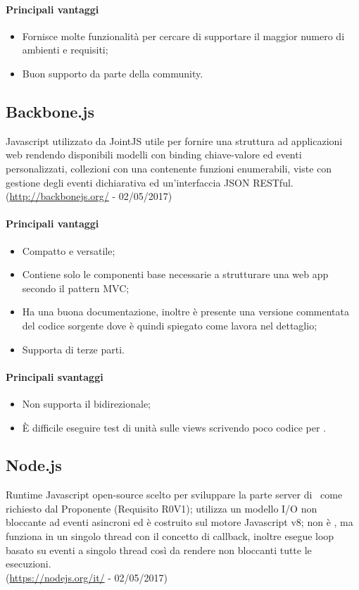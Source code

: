 \documentclass[../PianoDiQualifica.tex]{subfiles}
\begin{document}
			\paragraph{Principali vantaggi}
			\begin{itemize}
					\item Fornisce molte funzionalità per cercare di supportare il maggior numero di
					ambienti e requisiti;
					\item Buon supporto da parte della community.
				\end{itemize}
		\subsection{Backbone.js}
			 Javascript utilizzato da JointJS utile per fornire una struttura ad applicazioni
			web rendendo disponibili modelli con binding chiave-valore ed eventi personalizzati,
			collezioni con una  contenente funzioni enumerabili, viste con gestione degli eventi
			dichiarativa ed un'interfaccia JSON RESTful.\\
			(\url{http://backbonejs.org/} - 02/05/2017)
			\paragraph{Principali vantaggi}
			\begin{itemize}
					\item Compatto e versatile;
					\item Contiene solo le componenti base necessarie a strutturare una web app
					secondo il pattern MVC;
					\item Ha una buona documentazione, inoltre è presente una versione commentata
					del codice sorgente dove è quindi spiegato come lavora nel dettaglio;
					\item Supporta  di terze parti.
				\end{itemize}
			\paragraph{Principali svantaggi}
				\begin{itemize}
					\item Non supporta il  bidirezionale;
					\item È difficile eseguire test di unità sulle views scrivendo poco codice per .
				\end{itemize}
		\subsection{Node.js}
			Runtime Javascript open-source scelto per sviluppare la parte server di \progetto\,
			come richiesto dal Proponente (Requisito R0V1); utilizza un modello I/O non bloccante
			ad eventi asincroni ed è costruito sul motore Javascript v8; non è , ma
			funziona in un singolo thread con il concetto di callback, inoltre esegue loop basato
			su eventi a singolo thread così da rendere non bloccanti tutte le esecuzioni.\\
			(\url{https://nodejs.org/it/} - 02/05/2017)
\end{document}
